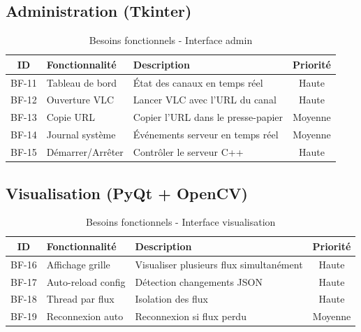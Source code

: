 \documentclass[12pt,a4paper]{report}
\begin{document}
\subsection{Administration (Tkinter)}

\begin{table}[H]
    \centering
    \caption{Besoins fonctionnels - Interface admin}
    \label{tab:bf3}
    \begin{tabular}{|c|l|l|c|}
        \hline
        \textbf{ID} & \textbf{Fonctionnalité} & \textbf{Description} & \textbf{Priorité} \\
        \hline
        BF-11 & Tableau de bord & État des canaux en temps réel & Haute \\
        BF-12 & Ouverture VLC & Lancer VLC avec l'URL du canal & Haute \\
        BF-13 & Copie URL & Copier l'URL dans le presse-papier & Moyenne \\
        BF-14 & Journal système & Événements serveur en temps réel & Moyenne \\
        BF-15 & Démarrer/Arrêter & Contrôler le serveur C++ & Haute \\
        \hline
    \end{tabular}
\end{table}

\subsection{Visualisation (PyQt + OpenCV)}

\begin{table}[H]
    \centering
    \caption{Besoins fonctionnels - Interface visualisation}
    \label{tab:bf4}
    \begin{tabular}{|c|l|l|c|}
        \hline
        \textbf{ID} & \textbf{Fonctionnalité} & \textbf{Description} & \textbf{Priorité} \\
        \hline
        BF-16 & Affichage grille & Visualiser plusieurs flux simultanément & Haute \\
        BF-17 & Auto-reload config & Détection changements JSON & Haute \\
        BF-18 & Thread par flux & Isolation des flux & Haute \\
        BF-19 & Reconnexion auto & Reconnexion si flux perdu & Moyenne \\
        \hline
    \end{tabular}
\end{table}
\end{document}
